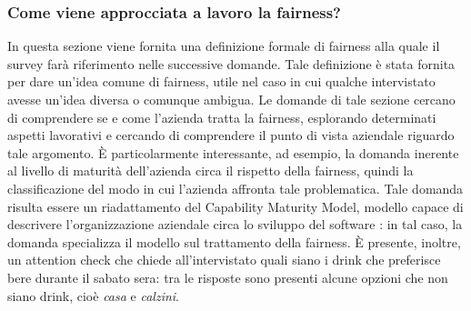 \subsubsection{Come viene approcciata a lavoro la fairness?}

In questa sezione viene fornita una definizione formale di fairness alla quale il survey farà riferimento nelle successive domande. Tale definizione è stata fornita per dare un'idea comune di fairness, utile nel caso in cui qualche intervistato avesse un'idea diversa o comunque ambigua. Le domande di tale sezione cercano di comprendere se e come l'azienda tratta la fairness, esplorando determinati aspetti lavorativi e cercando di comprendere il punto di vista aziendale riguardo tale argomento. È particolarmente interessante, ad esempio, la domanda inerente al livello di maturità dell'azienda circa il rispetto della fairness, quindi la classificazione del modo in cui l'azienda affronta tale problematica. Tale domanda risulta essere un riadattamento del Capability Maturity Model, modello capace di descrivere l'organizzazione aziendale circa lo sviluppo del software \cite{cmm}: in tal caso, la domanda specializza il modello sul trattamento della fairness.  È presente, inoltre, un attention check che chiede all'intervistato quali siano i drink che preferisce bere durante il sabato sera: tra le risposte sono presenti alcune opzioni che non siano drink, cioè \emph{casa} e \emph{calzini}.

